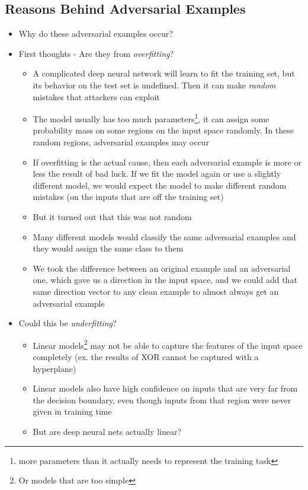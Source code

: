 \subsection{Reasons Behind Adversarial Examples}
\begin{itemize}
	\item Why do these adversarial examples occur?
	\item First thoughts - Are they from \textit{overfitting}?
	\begin{itemize}
		\item A complicated deep neural network will learn to fit the training set, but its behavior on the test set is undefined. Then it can make \textit{random} mistakes that attackers can exploit
		\item The model usually has too much parameters\footnote{more parameters than it actually needs to represent the training task}, it can assign some probability mass on some regions on the input space randomly. In these random regions, adversarial examples may occur 
		\item If overfitting is the actual cause, then each adversarial example is more or less the result of bad luck. If we fit the model again or use a slightly different model, we would expect the model to make different random mistakes (on the inputs that are off the training set)
		\item But it turned out that this was not random
		\item Many different models would classify the same adversarial examples and they would assign the same class to them
		\item We took the difference between an original example and an adversarial one, which gave us a direction in the input space, and we could add that same direction vector to any clean example to almost always get an adversarial example
	\end{itemize}
	\item Could this be \textit{underfitting}?
	\begin{itemize}
		\item Linear models\footnote{Or models that are too simple} may not be able to capture the features of the input space completely (ex. the results of XOR cannot be captured with a hyperplane)
		\item Linear models also have high confidence on inputs that are very far from the decision boundary, even though inputs from that region were never given in training time
		\item But are deep neural nets actually linear?

\end{itemize}
\end{itemize}
